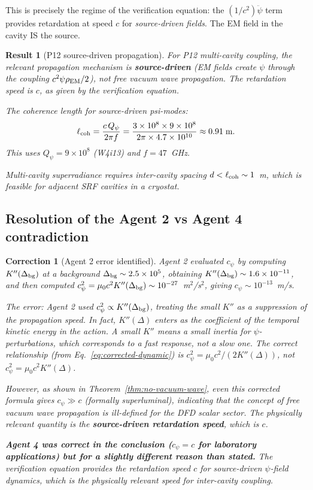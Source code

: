 \documentclass[11pt]{article}
\newtheorem{correction}{Correction}
\newtheorem{result}{Result}
\newcommand{\ee}[1]{\times 10^{#1}}
\begin{document}
This is precisely the regime of the verification equation: the
$(1/c^2)\ddot\psi$ term provides retardation at speed $c$ for
\emph{source-driven fields}. The EM field in the cavity IS the source.

\begin{result}[P12 source-driven propagation]
\label{res:p12-source}
For P12 multi-cavity coupling, the relevant propagation mechanism is
\textbf{source-driven} (EM fields create $\psi$ through the coupling
$c^2\psi\rho_{\rm EM}/2$), not free vacuum wave propagation. The
retardation speed is $c$, as given by the verification equation.

The coherence length for source-driven psi-modes:
\begin{equation}
\ell_{\rm coh} = \frac{c\,Q_\psi}{2\pi f}
= \frac{3\ee{8} \times 9\ee{8}}{2\pi \times 4.7\ee{10}}
\approx 0.91\;\text{m}.
\end{equation}
This uses $Q_\psi = 9\ee{8}$ (W4i13) and $f = 47$~GHz.

Multi-cavity superradiance requires inter-cavity spacing
$d < \ell_{\rm coh} \sim 1$~m, which is feasible for adjacent
SRF cavities in a cryostat.
\end{result}

\subsection{Resolution of the Agent 2 vs Agent 4 contradiction}

\begin{correction}[Agent 2 error identified]
\label{corr:agent2}
Agent 2 evaluated $c_\psi$ by computing $K''(\Delta_{\rm bg})$ at a
background $\Delta_{\rm bg} \sim 2.5\ee{5}$, obtaining
$K''(\Delta_{\rm bg}) \sim 1.6\ee{-11}$, and then computed
$c_\psi^2 = \mu_0 c^2 K''(\Delta_{\rm bg}) \sim 10^{-27}$~m$^2$/s$^2$,
giving $c_\psi \sim 10^{-13}$~m/s.

The error: Agent 2 used $c_\psi^2 \propto K''(\Delta_{\rm bg})$, treating
the small $K''$ as a \emph{suppression} of the propagation speed.
In fact, $K''(\Delta)$ enters as the coefficient of the temporal kinetic
energy in the action. A small $K''$ means a small \emph{inertia} for
$\psi$-perturbations, which corresponds to a \emph{fast} response,
not a slow one. The correct relationship (from Eq.~\eqref{eq:corrected-dynamic})
is $c_\psi^2 = \mu_0 c^2 / (2K''(\Delta))$, not $c_\psi^2 = \mu_0 c^2 K''(\Delta)$.

However, as shown in Theorem~\ref{thm:no-vacuum-wave}, even this
corrected formula gives $c_\psi \gg c$ (formally superluminal),
indicating that the concept of free vacuum wave propagation is
ill-defined for the DFD scalar sector. The physically relevant
quantity is the \textbf{source-driven retardation speed}, which is $c$.

\textbf{Agent 4 was correct in the conclusion ($c_\psi = c$ for
laboratory applications) but for a slightly different reason than
stated.} The verification equation provides the retardation speed $c$
for source-driven $\psi$-field dynamics, which is the physically
relevant speed for inter-cavity coupling.
\end{correction}
\end{document}
